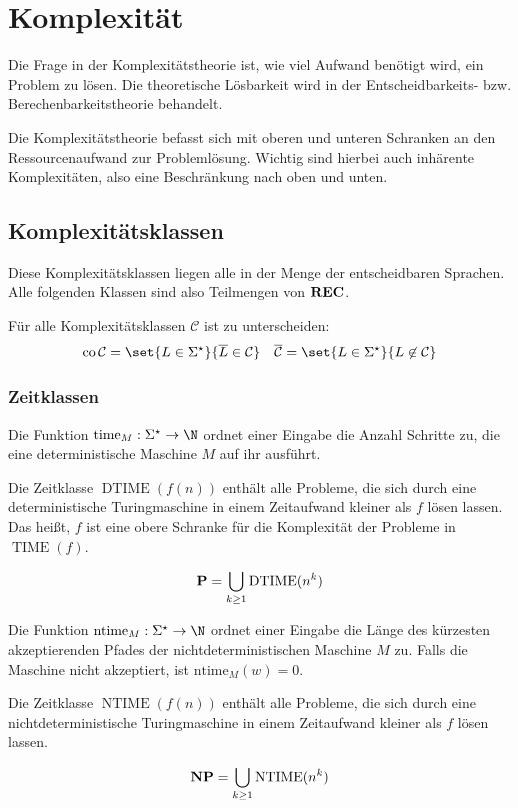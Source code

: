 \chapter{Komplexität}
Die Frage in der Komplexitätstheorie ist, wie viel Aufwand benötigt wird, ein Problem zu lösen.
Die theoretische Lösbarkeit wird in der Entscheidbarkeits- bzw. Berechenbarkeitstheorie behandelt.

Die Komplexitätstheorie befasst sich mit oberen und unteren Schranken an den Ressourcenaufwand zur Problemlösung.
Wichtig sind hierbei auch inhärente Komplexitäten, also eine Beschränkung nach oben und unten.
\section{Komplexitätsklassen}
Diese Komplexitätsklassen liegen alle in der Menge der entscheidbaren Sprachen. Alle folgenden Klassen sind also Teilmengen von $\operatorname{\mathbf{REC}}$.

Für alle Komplexitätsklassen $\mathcal C$ ist zu unterscheiden:
\begin{align*}
	\operatorname{co}\mathcal C=\set{L\in\Sigma^\star}{\overline L \in\mathcal C} && \overline{\mathcal C}=\set{L\in\Sigma^\star}{L\not\in \mathcal C}
\end{align*}
\subsection{Zeitklassen}
\begin{multicols}{2}
	Die Funktion $\mathrm{time}_M:\Sigma^\star\rightarrow \N$ ordnet einer Eingabe die Anzahl Schritte zu, die eine deterministische Maschine $M$ auf ihr ausführt.

	Die Zeitklasse $\operatorname{DTIME}(f(n))$ enthält alle Probleme, die sich durch eine deterministische Turingmaschine in einem Zeitaufwand kleiner als $f$ lösen lassen. Das heißt, $f$ ist eine obere Schranke für die Komplexität der Probleme in $\operatorname{TIME}(f)$.

	\begin{equation*}
		\textbf{P}=\displaystyle\bigcup_{k\geq 1} \operatorname{DTIME}(n^k)
	\end{equation*}

	\columnbreak

	Die Funktion $\mathrm{ntime}_M:\Sigma^\star\rightarrow \N$ ordnet einer Eingabe die Länge des kürzesten akzeptierenden Pfades der nichtdeterministischen Maschine $M$ zu. Falls die Maschine nicht akzeptiert, ist $\mathrm{ntime}_M(w)=0$.

	Die Zeitklasse $\operatorname{NTIME}(f(n))$ enthält alle Probleme, die sich durch eine nichtdeterministische Turingmaschine in einem Zeitaufwand kleiner als $f$ lösen lassen.

	\begin{equation*}
		\textbf{NP}=\displaystyle\bigcup_{k\geq 1} \operatorname{NTIME}(n^k)
	\end{equation*}
\end{multicols}


